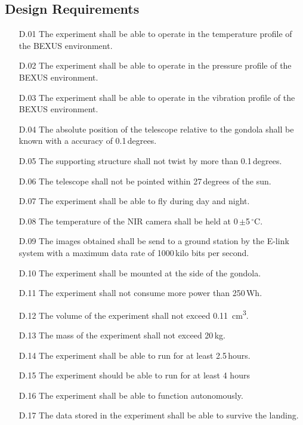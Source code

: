 \subsection{Design Requirements}

\begin{enumerate}
	\item[D.01] The experiment shall be able to operate in the temperature profile of the BEXUS environment.
	\item[D.02] The experiment shall be able to operate in the pressure profile of the BEXUS environment.
    \item[D.03] The experiment shall be able to operate in the vibration profile of the BEXUS environment.
    \item[D.04] The absolute position of the telescope relative to the gondola shall be known with a accuracy of 0.1\,degrees.
	\item[D.05] The supporting structure shall not twist by more than 0.1\,degrees.
	\item[D.06] The telescope shall not be pointed within 27\,degrees of the sun.
	\item[D.07] The experiment shall be able to fly during day and night.
	\item[D.08] The temperature of the NIR camera shall be held at 0\,$\pm$5\,$^\circ$C.
	\item[D.09] The images obtained shall be send to a ground station by the E-link system with a maximum data rate of 1000\,kilo bits per second.
	\item[D.10] The experiment shall be mounted at the side of the gondola.
	\item[D.11] The experiment shall not consume more power than 250\,Wh.
    \item[D.12] The volume of the experiment shall not exceed \SI{0.11}{cm\cubed}.
    \item[D.13] The mass of the experiment shall not exceed 20\,kg.
    \item[D.14] The experiment shall be able to run for at least 2.5\,hours.
    \item [D.15] The experiment should be able to run for at least 4 hours
    \item[D.16] The experiment shall be able to function autonomously.
    \item[D.17] The data stored in the experiment shall be able to survive the landing.
\end{enumerate}
